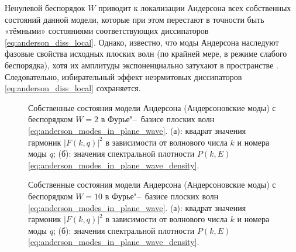 Ненулевой беспорядок \(W\) приводит к локализации Андерсона всех собственных состояний данной модели, которые при этом перестают в точности быть «тёмными» состояниями соответствующих диссипаторов \cref{eq:anderson_diss_local}.
Однако, известно, что моды Андерсона наследуют фазовые свойства исходных плоских волн (по крайней мере, в режиме слабого беспорядка), хотя их амплитуды экспоненциально затухают в пространстве \cite{Ishii1973}.
Следовательно, избирательный эффект неэрмитовых диссипаторов \cref{eq:anderson_diss_local} сохраняется.
\begin{figure}[h]
	\legend{}
	\caption[Этот текст попадает в названия рисунков в списке рисунков]
	{
		Собственные состояния модели Андерсона (Андерсоновские моды) с беспорядком \(W=2\) в Фурье"--~базисе плоских волн \cref{eq:anderson_modes_in_plane_wave}. (а): квадрат значения гармоник \(\left| F(k,q) \right|^2\) в зависимости от волнового числа \(k\) и номера моды \(q\); (б): значения спектральной плотности \(P(k,E)\) \cref{eq:anderson_modes_in_plane_wave_density}.
	}
	\label{fig:anderson_modes_in_foutier_1}
\end{figure}
\begin{figure}[h]
	\legend{}
	\caption[Этот текст попадает в названия рисунков в списке рисунков]
	{
		Собственные состояния модели Андерсона (Андерсоновские моды) с беспорядком \(W=10\) в Фурье"--~базисе плоских волн \cref{eq:anderson_modes_in_plane_wave}. (а): квадрат значения гармоник \(\left| F(k,q) \right|^2\) в зависимости от волнового числа \(k\) и номера моды \(q\); (б): значения спектральной плотности \(P(k,E)\) \cref{eq:anderson_modes_in_plane_wave_density}.
	}
	\label{fig:anderson_modes_in_foutier_2}
\end{figure}
